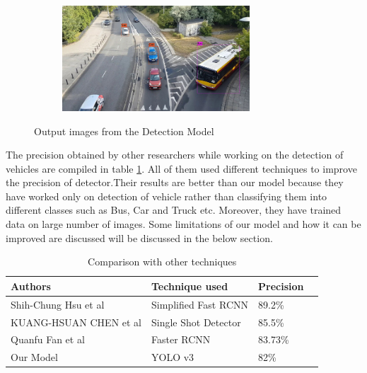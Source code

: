 \begin{figure}
    \quad
    \begin{subfigure}[t]{0.475\textwidth}   
        \centering 
        \includegraphics[width = 7cm, height = 5 cm]{CHAPTERS/Chapter-5/images/5.12d.jpg}
        \caption[]%
        {{\small }}    
        \label{fig:mean and std of net44}
    \end{subfigure}
    \caption[ ]
    {\small Output images from the Detection Model}
    \label{fig:5.12}
\end{figure}
 The precision obtained by other researchers while working on the detection of vehicles are 
 compiled in table \ref{table:5.3}.  All of them used different techniques to improve the precision of detector.Their results are better than our model because they have worked only on detection of vehicle rather than classifying them into different classes such as Bus, Car and Truck etc. Moreover, they have trained data on large number of images. Some limitations of our model and how it can be improved are discussed will be discussed in the below section.
 \begin{table}[H]
	\caption{Comparison with other techniques}
	\label{table:5.3}
	  \begin{center}
		\scalebox{1.1}
		{\begin{tabular}{|l |l |l |l |}
	    \hline
	    Authors  & Technique used &  Precision
		\\ \hline
		Shih-Chung Hsu et al \cite{chap_5_article:4} & Simplified Fast RCNN & 89.2\%
		\\ \hline
		KUANG-HSUAN CHEN et al \cite{chap_5_article:5} & Single Shot Detector & 85.5\%
		\\ \hline  
		Quanfu Fan et al \cite{chap_5_article:6} & Faster RCNN & 83.73\%
		\\ \hline
		Our Model & YOLO v3 & 82\%
		\\ \hline
		
		\end{tabular}}
	  \end{center}
\end{table}

